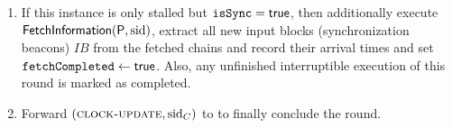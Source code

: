 \begin{cccProtocol}
\begin{cccItemize}[nosep]
\begin{enumerate}[label=\arabic*,leftmargin=*, nosep]
            \item If this instance is only stalled but $\mathtt{isSync} = \mathsf{true}$, then additionally execute $\mathsf{FetchInformation}(\mathsf{P}, \mathrm{sid})$, extract all new input blocks (synchronization beacons) $IB$ from the fetched chains and record their arrival times and set $\mathtt{fetchCompleted} \gets \mathsf{true}$.
                  Also, any unfinished interruptible execution of this round is marked as completed.

            \item Forward $(\textsc{clock-update}, \mathrm{sid}_C)$ to \funcDriftingClock to finally conclude the round.
        \end{enumerate}
    \end{cccItemize}
\end{cccProtocol}